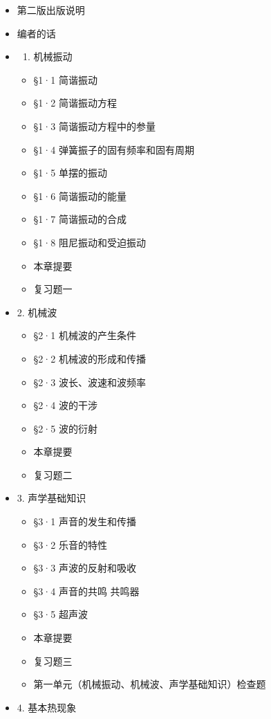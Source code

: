 \begin{itemize}
\item
  第二版出版说明
\item
  编者的话
\item
  \begin{enumerate}
  \def\labelenumi{\arabic{enumi}.}
  \tightlist
  \item
    机械振动
  \end{enumerate}

  \begin{itemize}
  \tightlist
  \item
    §1·1 简谐振动
  \item
    §1·2 简谐振动方程
  \item
    §1·3 简谐振动方程中的参量
  \item
    §1·4 弹簧振子的固有频率和固有周期
  \item
    §1·5 单摆的振动
  \item
    §1·6 简谐振动的能量
  \item
    §1·7 简谐振动的合成
  \item
    §1·8 阻尼振动和受迫振动
  \item
    本章提要
  \item
    复习题一
  \end{itemize}
\item
  2. 机械波

  \begin{itemize}
  \tightlist
  \item
    §2·1 机械波的产生条件
  \item
    §2·2 机械波的形成和传播
  \item
    §2·3 波长、波速和波频率
  \item
    §2·4 波的干涉
  \item
    §2·5 波的衍射
  \item
    本章提要
  \item
    复习题二
  \end{itemize}
\item
  3. 声学基础知识

  \begin{itemize}
  \tightlist
  \item
    §3·1 声音的发生和传播
  \item
    §3·2 乐音的特性
  \item
    §3·3 声波的反射和吸收
  \item
    §3·4 声音的共鸣 共鸣器
  \item
    §3·5 超声波
  \item
    本章提要
  \item
    复习题三
  \item
    第一单元（机械振动、机械波、声学基础知识）检查题
  \end{itemize}
\item
  4. 基本热现象


\end{itemize}
